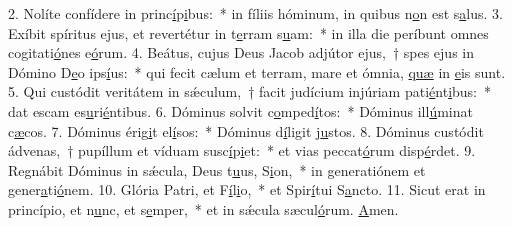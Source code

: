 2. Nolíte confídere in princ\uline{í}p\uline{i}bus:~* in fíliis hóminum, in quibus n\uline{o}n est s\uline{a}lus.
3. Exíbit spíritus ejus, et revertétur in t\uline{e}rram s\uline{u}am:~* in illa die períbunt omnes cogitati\uline{ó}nes e\uline{ó}rum.
4. Beátus, cujus Deus Jacob adjútor ejus,~† spes ejus in Dómino D\uline{e}o ips\uline{í}us:~* qui fecit cælum et terram, mare et ómnia, \uline{quæ} in \uline{e}is sunt.
5. Qui custódit veritátem in sǽculum,~† facit judícium injúriam pati\uline{é}nt\uline{i}bus:~* dat escam es\uline{u}ri\uline{é}ntibus.
6. Dóminus solvit c\uline{o}mped\uline{í}tos:~* Dóminus ill\uline{ú}minat c\uline{æ}cos.
7. Dóminus érig\uline{i}t el\uline{í}sos:~* Dóminus d\uline{í}ligit j\uline{u}stos.
8. Dóminus custódit ádvenas,~† pupíllum et víduam susc\uline{í}p\uline{i}et:~* et vias peccat\uline{ó}rum disp\uline{é}rdet.
9. Regnábit Dóminus in sǽcula, Deus t\uline{u}us, S\uline{i}on,~* in generatiónem et gener\uline{a}ti\uline{ó}nem.
10. Glória Patri, et F\uline{í}l\uline{i}o,~* et Spir\uline{í}tui S\uline{a}ncto.
11. Sicut erat in princípio, et n\uline{u}nc, et s\uline{e}mper,~* et in sǽcula sæcul\uline{ó}rum. \uline{A}men.
